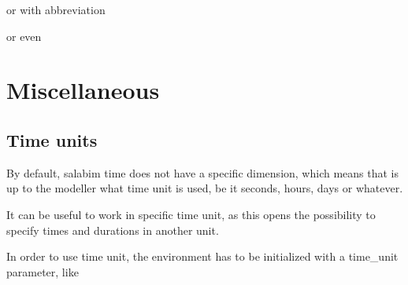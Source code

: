 \documentclass[letterpaper,10pt,english]{sphinxmanual}
\begin{document}
%
\begin{sphinxVerbatim}[commandchars=\\\{\}]
\end{sphinxVerbatim}

or with abbreviation

%
\begin{sphinxVerbatim}[commandchars=\\\{\}]
\end{sphinxVerbatim}

or even

%
\begin{sphinxVerbatim}[commandchars=\\\{\}]
\end{sphinxVerbatim}


\chapter{Miscellaneous}
\label{\detokenize{Miscellaneous:miscellaneous}}\label{\detokenize{Miscellaneous::doc}}

\section{Time units}
\label{\detokenize{Miscellaneous:time-units}}
By default, salabim time does not have a specific dimension, which means that is up to
the modeller what time unit is used, be it seconds, hours, days or whatever.

It can be useful to work in specific time unit, as this opens the possibility to specify times and durations in another unit.

In order to use time unit, the environment has to be initialized with a time\_unit parameter, like
\end{document}
